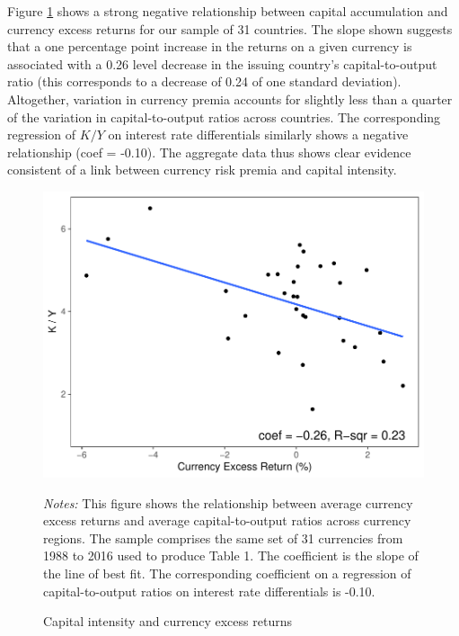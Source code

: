 \documentclass{ar-1col}
\begin{document}

Figure \ref{fig:ky_rx} shows a strong negative relationship between capital accumulation and currency excess returns for our sample of 31 countries. The slope shown suggests that a one percentage point increase in the returns on a given currency is associated with a 0.26 level decrease in the issuing country's capital-to-output ratio (this corresponds to a decrease of 0.24 of one standard deviation). Altogether, variation in currency premia accounts for slightly less than a quarter of the variation in capital-to-output ratios across countries. The corresponding regression of $K/Y$ on interest rate differentials similarly shows a negative relationship (coef = -0.10). The aggregate data thus shows clear evidence consistent of a link between currency risk premia and capital intensity. 
\begin{figure}[htp]
    \centering
    \caption{Capital intensity and currency excess returns}
    \label{fig:ky_rx}
    \includegraphics[width=0.7\linewidth]{Exhibits/Figure_KY_RX.pdf}
    \begin{minipage}[htp]{\textwidth}
    \scriptsize 
    \emph{Notes:} This figure shows the relationship between average currency excess returns and average capital-to-output ratios across currency regions. The sample comprises the same set of 31 currencies from 1988 to 2016 used to produce Table 1. The coefficient is the slope of the line of best fit. The corresponding coefficient on a regression of capital-to-output ratios on interest rate differentials is -0.10.
    \end{minipage}
\end{figure}
\end{document}
